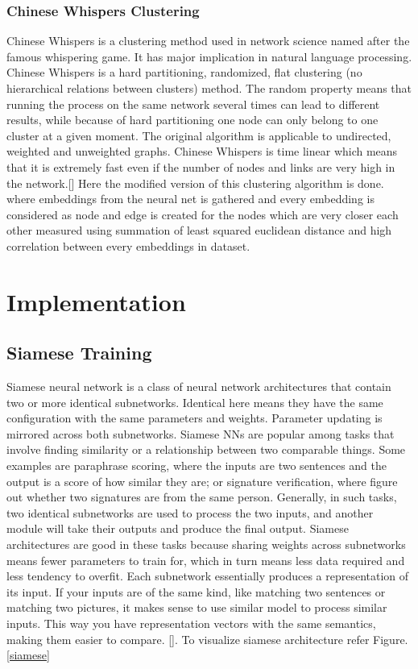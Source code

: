 \documentclass[a4paper,12pt, twoside]{NITKReport}
\begin{document}
\subsection{Chinese Whispers Clustering}
\par Chinese Whispers is a clustering method used in network science named after the famous whispering game. It has major implication in natural language processing. Chinese Whispers is a hard partitioning, randomized, flat clustering (no hierarchical relations between clusters) method. The random property means that running the process on the same network several times can lead to different results, while because of hard partitioning one node can only belong to one cluster at a given moment. The original algorithm is applicable to undirected, weighted and unweighted graphs. Chinese Whispers is time linear which means that it is extremely fast even if the number of nodes and links are very high in the network.[\cite{biemann2006chinese}] Here the modified version of this clustering algorithm is done. where embeddings from the neural net is gathered and every embedding is considered as node and edge is created for the nodes which are very closer each other measured using summation of least squared euclidean distance and high correlation between every embeddings in dataset.

\newpage
\chapter{Implementation}
\label{chap4}
\section{Siamese Training}
\par Siamese neural network is a class of neural network architectures that contain two or more identical subnetworks. Identical here means they have the same configuration with the same parameters and weights. Parameter updating is mirrored across both subnetworks. Siamese NNs are popular among tasks that involve finding similarity or a relationship between two comparable things. Some examples are paraphrase scoring, where the inputs are two sentences and the output is a score of how similar they are; or signature verification, where figure out whether two signatures are from the same person. Generally, in such tasks, two identical subnetworks are used to process the two inputs, and another module will take their outputs and produce the final output. Siamese architectures are good in these tasks because sharing weights across subnetworks means fewer parameters to train for, which in turn means less data required and less tendency to overfit. Each subnetwork essentially produces a representation of its input. If your inputs are of the same kind, like matching two sentences or matching two pictures, it makes sense to use similar model to process similar inputs. This way you have representation vectors with the same semantics, making them easier to compare. [\cite{bromley1993reputation}]. To visualize siamese architecture refer Figure.\ref{siamese}
\end{document}
